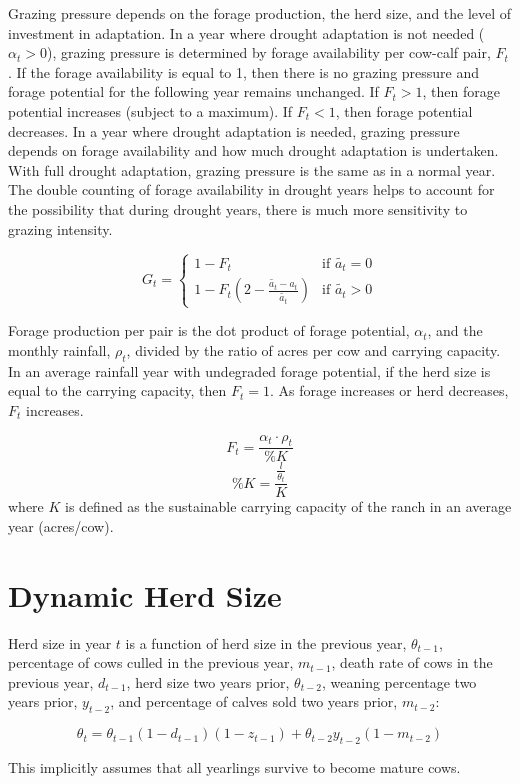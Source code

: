 \documentclass[11pt]{article}
\begin{document}
Grazing pressure depends on the forage production, the herd size, and the level of investment in adaptation. In a year where drought adaptation is not needed ($\alpha_t > 0$), grazing pressure is determined by forage availability per cow-calf pair, $F_t$. If the forage availability is equal to 1, then there is no grazing pressure and forage potential for the following year remains unchanged. If $F_t > 1$, then forage potential increases (subject to a maximum). If $F_t < 1$, then forage potential decreases. In a year where drought adaptation is needed, grazing pressure depends on forage availability and how much drought adaptation is undertaken. With full drought adaptation, grazing pressure is the same as in a normal year. The double counting of forage availability in drought years helps to account for the possibility that during drought years, there is much more sensitivity to grazing intensity.  

\begin{equation}
G_t = 
\begin{cases}
1 - F_t & \text{if } \tilde{a_t} = 0 \\
1 - F_t(2 - \frac{\tilde{a_t} - a_t}{\tilde{a_t}}) & \text{if } \tilde{a_t} > 0  
\end{cases}
\end{equation}

Forage production per pair is the dot product of forage potential, $\alpha_t$, and the monthly rainfall, $\rho_t$, divided by the ratio of acres per cow and carrying capacity. In an average rainfall year with undegraded forage potential, if the herd size is equal to the carrying capacity, then $F_t = 1$. As forage increases or herd decreases, $F_t$ increases.

\begin{equation}
F_t = \frac{\alpha_t \cdot \rho_t}{\%K}
\end{equation}
\begin{equation}
\%K = \frac{\frac{l}{\theta_t}}{K}
\end{equation}
where $K$ is defined as the sustainable carrying capacity of the ranch in an average year (acres/cow).

\section{Dynamic Herd Size}
Herd size in year $t$ is a function of herd size in the previous year, $\theta_{t-1}$, percentage of cows culled in the previous year, $m_{t-1}$, death rate of cows in the previous year, $d_{t-1}$, herd size two years prior, $\theta_{t-2}$, weaning percentage two years prior, $y_{t-2}$, and percentage of calves sold two years prior, $m_{t-2}$:

\begin{equation}
\theta_t = \theta_{t-1} (1- d_{t-1}) (1 - z_{t-1}) + \theta_{t-2} y_{t-2} (1 - m_{t-2})
\end{equation} 

This implicitly assumes that all yearlings survive to become mature cows.
\end{document}
